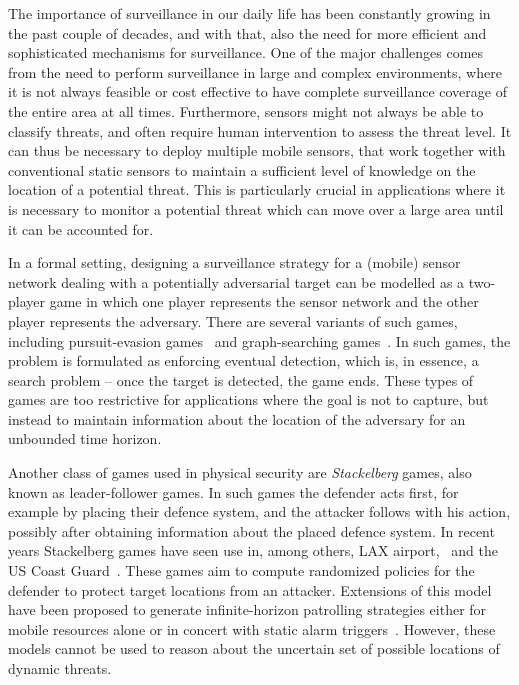 The importance of surveillance in our daily life has been constantly growing in the past couple of decades, and with that, also the need for more efficient and sophisticated mechanisms for surveillance. One of the major challenges comes from the need to perform surveillance in large and complex environments, where it is not always feasible or cost effective to have complete surveillance coverage of the entire area at all times. Furthermore, sensors  might not always be able to classify threats, and often require human intervention to assess the threat level. It can thus be necessary to deploy multiple mobile sensors, that work together with conventional static sensors to maintain a sufficient level of knowledge on the location of a potential threat. This is particularly crucial in applications where it is necessary to monitor a potential threat which can move over a large area until it can be accounted for.

In a formal setting, designing a surveillance strategy for a (mobile) sensor network dealing with a potentially adversarial target can be modelled as a two-player game in which one player represents the sensor network and the other player represents the adversary. There are several variants of such games, including pursuit-evasion games~\cite{Chung2011} and graph-searching games~\cite{Kreutzer11}. In such games,	 the problem is formulated as enforcing eventual detection, which is, in essence, a search problem -- once the target is detected, the game ends. These types of games are too restrictive for applications where the goal is not to capture, but instead  to maintain information about the location of the adversary for an unbounded time horizon.

Another class of games used in physical security are \emph{Stackelberg} games, also known as leader-follower games. In such games the defender acts first, for example by placing their defence system, and the attacker follows with his action, possibly after obtaining information about the placed defence system. In recent years Stackelberg games have seen use in, among others, LAX airport,~\cite{jain2012overview} and the US Coast Guard~\cite{An11}. These games aim to compute randomized policies for the defender to protect target locations from an attacker. Extensions of this model~\cite{Basilico12} have been proposed to generate infinite-horizon patrolling strategies either for mobile resources alone or in concert with static alarm triggers~\cite{basilico2016security,Munoz13}. However, these models cannot be used to reason about the uncertain set of possible  locations of dynamic threats.

